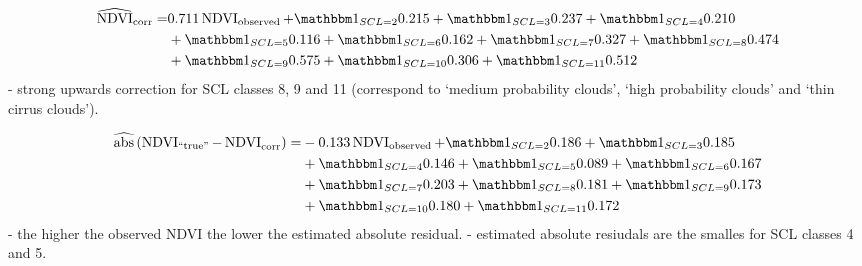 \begin{equation}\label{eq:corr_lm}
	\begin{aligned}		
		\widehat{\operatorname{NDVI}}_{\text{corr}}  = &
		0.711 \operatorname{NDVI}_\text{observed}  
		+ \mathbbm 1_{{SCL = 2}} 0.215 
		+ \mathbbm 1_{{SCL = 3}} 0.237 
		+ \mathbbm 1_{{SCL = 4}} 0.210 \\ &
		+ \mathbbm 1_{{SCL = 5}} 0.116 
		+ \mathbbm 1_{{SCL = 6}} 0.162 
		+ \mathbbm 1_{{SCL = 7}} 0.327 
		+ \mathbbm 1_{{SCL = 8}} 0.474 \\ &
		+ \mathbbm 1_{{SCL = 9}} 0.575 
		+ \mathbbm 1_{{SCL = 10}} 0.306 
		+ \mathbbm 1_{{SCL = 11}} 0.512 
	\end{aligned}
\end{equation}
- strong upwards correction for SCL classes 8, 9 and 11 (correspond to `medium probability clouds', `high probability clouds' and `thin cirrus clouds').

\begin{equation}\label{eq:corr_lm_res}
	\begin{aligned}		
		\widehat{\operatorname{abs}}\left({\operatorname{NDVI}_\text{``true''} - \operatorname{NDVI}}_{\text{corr}}\right)  = &
		-0.133 \operatorname{NDVI}_\text{observed}  
		+ \mathbbm 1_{{SCL = 2}} 0.186 
		+ \mathbbm 1_{{SCL = 3}} 0.185 \\ &
		+ \mathbbm 1_{{SCL = 4}} 0.146 
		+ \mathbbm 1_{{SCL = 5}} 0.089 
		+ \mathbbm 1_{{SCL = 6}} 0.167 \\ &
		+ \mathbbm 1_{{SCL = 7}} 0.203 
		+ \mathbbm 1_{{SCL = 8}} 0.181  
		+ \mathbbm 1_{{SCL = 9}} 0.173 \\ &
		+ \mathbbm 1_{{SCL = 10}} 0.180 
		+ \mathbbm 1_{{SCL = 11}} 0.172 
	\end{aligned}
\end{equation}
- the higher the observed NDVI the lower the estimated absolute residual.
- estimated absolute resiudals are the smalles for SCL classes 4 and 5.  
